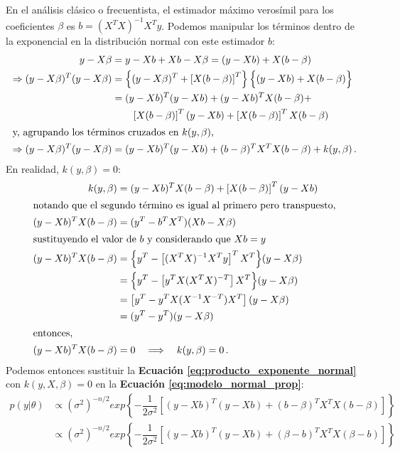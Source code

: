 En el análisis clásico o frecuentista, el estimador máximo verosímil para los coeficientes $\beta$ es $b=(X^TX)^{-1}X^Ty$. Podemos manipular los términos dentro de la exponencial en la distribución normal con este estimador $b$: 
\begin{align} \label{eq:producto_exponente_normal}
y-X\beta &= y - Xb + Xb - X\beta = (y-Xb) + X(b-\beta) \nonumber \\
\Rightarrow (y-X\beta)^T(y-X\beta) &= \left\lbrace (y-X\beta)^T + \left[X(b-\beta)\right]^T \right\rbrace \Big\{ (y-Xb) + X(b-\beta) \Big\} \nonumber \\
 & = (y-Xb)^T(y-Xb) + (y-Xb)^TX(b-\beta) + \nonumber \\
 &\qquad \left[X(b-\beta)\right]^T(y-Xb) + \left[X(b-\beta)\right]^TX(b-\beta) \nonumber \\
\intertext{y, agrupando los términos cruzados en $k(y,\beta)$,}
\Rightarrow (y-X\beta)^T(y-X\beta) & = (y-Xb)^T(y-Xb) + (b-\beta)^TX^TX(b-\beta) + k(y,\beta)\,.
\end{align}
En realidad, $k(y,\beta) = 0$: 
\begin{align*}
k(y,\beta) &= (y-Xb)^TX(b-\beta) + \left[X(b-\beta)\right]^T(y-Xb)\\
\intertext{notando que el segundo término es igual al primero pero transpuesto,}
(y-Xb)^TX(b-\beta) &= (y^T - b^TX^T)(Xb-X\beta)\\
\intertext{sustituyendo el valor de $b$ y considerando que $Xb=y$}
(y-Xb)^TX(b-\beta) &= 
\Big\{ y^T - \left[(X^TX)^{-1}X^Ty \right]^TX^T \Big\}
(y-X\beta) \\
 &= \Big\{y^T - \left[y^TX(X^TX)^{-T}\right]X^T\Big\}
 (y-X\beta)\\
 &= \left[y^T - y^TX(X^{-1}X^{-T})X^T\right]
 (y-X\beta)\\
 &= (y^T - y^T)(y-X\beta)\\
\intertext{entonces,}
(y-Xb)^TX(b-\beta) &= 0 \quad \Longrightarrow \quad k(y,\beta) = 0\,.
\end{align*}
Podemos entonces sustituir la \textbf{Ecuación \ref{eq:producto_exponente_normal}} con $k(y,X,\beta) = 0$ en la \textbf{Ecuación \ref{eq:modelo_normal_prop}}: 
\begin{align*}
p(y|\theta) &\propto (\sigma^2)^{-n/2}exp\left\lbrace -\dfrac{1}{2\sigma^2}\left[(y-Xb)^T(y-Xb) + (b-\beta)^TX^TX(b-\beta)\right] \right\rbrace\\
&\propto (\sigma^2)^{-n/2}exp\left\lbrace -\dfrac{1}{2\sigma^2}\left[(y-Xb)^T(y-Xb) + (\beta-b)^TX^TX(\beta-b)\right] \right\rbrace
\end{align*}
